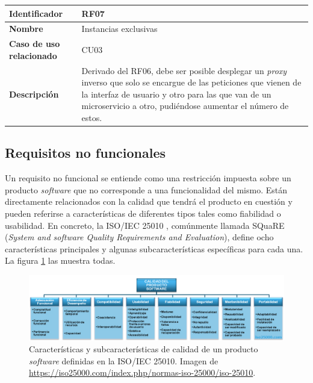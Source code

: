 \documentclass[11pt,spanish,listoffigures]{tfgetsinf}
\begin{document}
\begin{center} \begin{tabular}{| l | p{9.5cm} |}
\hline
\textbf{Identificador} & RF07
\\ \hline
\textbf{Nombre} & Instancias exclusivas
\\ \hline
\textbf{Caso de uso relacionado} & CU03
\\ \hline
\textbf{Descripción} & Derivado del RF06, debe ser posible desplegar un \emph{proxy} inverso que solo se encargue de las peticiones que vienen de la interfaz de usuario y otro para las que van de un microservicio a otro, pudiéndose aumentar el número de estos.
\\ \hline \end{tabular} \end{center}


		\subsection{Requisitos no funcionales} \label{requisitosNoFuncionales}
		
Un requisito no funcional se entiende como una restricción impuesta sobre un producto \emph{software} que no corresponde a una funcionalidad del mismo. Están directamente relacionados con la calidad que tendrá el producto en cuestión y pueden referirse a características de diferentes tipos tales como fiabilidad o usabilidad. En concreto, la ISO/IEC 25010 \cite{ISO25010}, comúnmente llamada SQuaRE (\emph{System and software Quality Requirements and Evaluation}), define ocho características principales y algunas subcaracterísticas específicas para cada una. La figura \ref{iso25010} las muestra todas.

\begin{figure}[ht]
\centering
\includegraphics[width=1\textwidth]{imagenes/iso25010}
\caption[Características y subcaracterísticas de calidad de un producto \emph{software} definidas en la ISO/IEC 25010.]{Características y subcaracterísticas de calidad de un producto \emph{software} definidas en la ISO/IEC 25010. Imagen de \url{https://iso25000.com/index.php/normas-iso-25000/iso-25010}.}
	\label{iso25010}
\end{figure}
\end{document}
